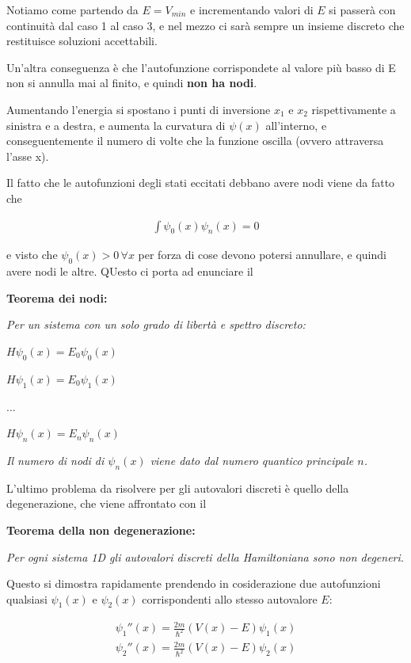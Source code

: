 Notiamo come partendo da $E=V_{min}$ e incrementando valori di $E$ si passerà con continuità dal caso 1 al caso 3, e nel mezzo ci sarà sempre un insieme discreto che restituisce soluzioni accettabili.

Un'altra conseguenza è che l'autofunzione corrispondete al valore più basso di E non si annulla mai al finito, e quindi \textbf{non ha nodi}.

Aumentando l'energia si spostano i punti di inversione $x_1$ e $x_2$ rispettivamente a sinistra e a destra, e aumenta la curvatura di $\psi(x)$ all'interno, e conseguentemente il numero di volte che la funzione oscilla (ovvero attraversa l'asse x).

\newpage

Il fatto che le autofunzioni degli stati eccitati debbano avere nodi viene da fatto che 

\begin{align}
\int \psi_0(x)\psi_n(x)=0
\end{align}

e visto che $\psi_0(x)>0 \, \forall x$ per forza di cose devono potersi annullare, e quindi avere nodi le altre. QUesto ci porta ad enunciare il

\bigskip

\textbf{Teorema dei nodi:} 

\textit{Per un sistema con un solo grado di libertà e spettro discreto:}

\smallskip

$H\psi_0(x)= E_0\psi_0(x)$

$H\psi_1(x)= E_0\psi_1(x)$

...

$H\psi_n(x)= E_n\psi_n(x)$
\smallskip

\textit{Il numero di nodi di $\psi_n(x)$ viene dato dal numero quantico principale $n$.}

\bigskip

L'ultimo problema da risolvere per gli autovalori discreti è quello della degenerazione, che viene affrontato con il 


\textbf{Teorema della non degenerazione:}

\textit{Per ogni sistema 1D gli autovalori discreti della Hamiltoniana sono non degeneri.}

\bigskip

Questo si dimostra rapidamente prendendo in cosiderazione due autofunzioni qualsiasi $\psi_1(x)$ e $\psi_2(x)$ corrispondenti allo stesso autovalore $E$:

\begin{align}
\psi_1''(x) = \frac{2m}{\hbar^2}(V(x)-E)\psi_1(x) \\
\psi_2''(x) = \frac{2m}{\hbar^2}(V(x)-E)\psi_2(x)
\end{align}

